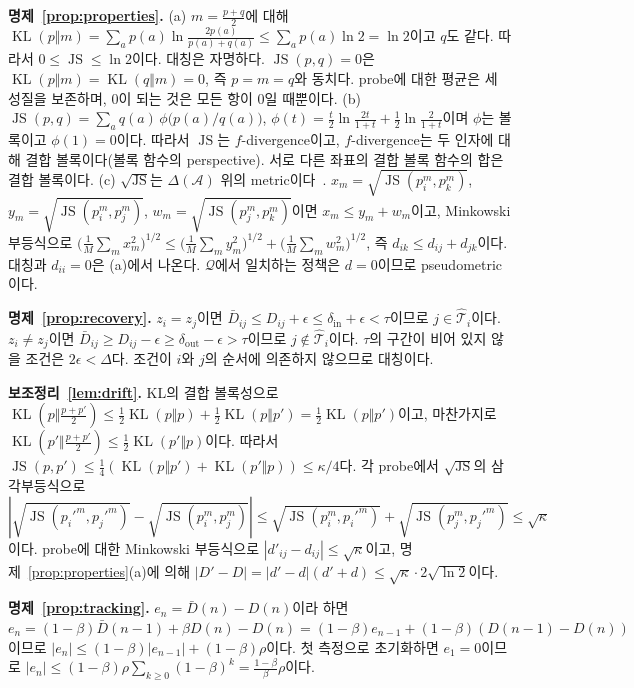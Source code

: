 \documentclass[twocolumn,10pt]{article}
\theoremstyle{remark}
\newcommand{\JS}{\operatorname{JS}}
\newcommand{\KL}{\operatorname{KL}}
\begin{document}
\textbf{명제~\ref{prop:properties}.}
(a) $m=\frac{p+q}{2}$에 대해 $\KL(p\Vert m)=\sum_a p(a)\ln\frac{2p(a)}{p(a)+q(a)}\le\sum_a p(a)\ln 2=\ln 2$이고 $q$도 같다. 따라서 $0\le\JS\le\ln2$이다. 대칭은 자명하다.
$\JS(p,q)=0$은 $\KL(p\Vert m)=\KL(q\Vert m)=0$, 즉 $p=m=q$와 동치다. probe에 대한 평균은 세 성질을 보존하며, 0이 되는 것은 모든 항이 0일 때뿐이다.
(b) $\JS(p,q)=\sum_a q(a)\,\phi\!\big(p(a)/q(a)\big)$, $\phi(t)=\frac{t}{2}\ln\frac{2t}{1+t}+\frac12\ln\frac{2}{1+t}$이며 $\phi$는 볼록이고 $\phi(1)=0$이다. 따라서 $\JS$는
$f$-divergence이고, $f$-divergence는 두 인자에 대해 결합 볼록이다(볼록 함수의 perspective). 서로 다른 좌표의 결합 볼록 함수의 합은 결합 볼록이다.
(c) $\sqrt{\JS}$는 $\Delta(\mathcal{A})$ 위의 metric이다~\cite{endres2003metric}. $x_m=\sqrt{\JS(p_i^m,p_k^m)}$, $y_m=\sqrt{\JS(p_i^m,p_j^m)}$, $w_m=\sqrt{\JS(p_j^m,p_k^m)}$이면
$x_m\le y_m+w_m$이고, Minkowski 부등식으로 $\big(\frac1M\sum_m x_m^2\big)^{1/2}\le\big(\frac1M\sum_m y_m^2\big)^{1/2}+\big(\frac1M\sum_m w_m^2\big)^{1/2}$, 즉 $d_{ik}\le d_{ij}+d_{jk}$이다.
대칭과 $d_{ii}=0$은 (a)에서 나온다. $\mathcal{Q}$에서 일치하는 정책은 $d=0$이므로 pseudometric이다.

\textbf{명제~\ref{prop:recovery}.} $z_i=z_j$이면 $\bar D_{ij}\le D_{ij}+\epsilon\le\delta_{\mathrm{in}}+\epsilon<\tau$이므로 $j\in\hat{\mathcal{T}}_i$이다. $z_i\ne z_j$이면
$\bar D_{ij}\ge D_{ij}-\epsilon\ge\delta_{\mathrm{out}}-\epsilon>\tau$이므로 $j\notin\hat{\mathcal{T}}_i$이다. $\tau$의 구간이 비어 있지 않을 조건은 $2\epsilon<\Delta$다. 조건이 $i$와 $j$의
순서에 의존하지 않으므로 대칭이다.

\textbf{보조정리~\ref{lem:drift}.} KL의 결합 볼록성으로 $\KL(p\Vert\frac{p+p'}{2})\le\frac12\KL(p\Vert p)+\frac12\KL(p\Vert p')=\frac12\KL(p\Vert p')$이고, 마찬가지로
$\KL(p'\Vert\frac{p+p'}{2})\le\frac12\KL(p'\Vert p)$이다. 따라서 $\JS(p,p')\le\frac14(\KL(p\Vert p')+\KL(p'\Vert p))\le\kappa/4$다. 각 probe에서 $\sqrt{\JS}$의 삼각부등식으로
$|\sqrt{\JS(p_i'^m,p_j'^m)}-\sqrt{\JS(p_i^m,p_j^m)}|\le\sqrt{\JS(p_i^m,p_i'^m)}+\sqrt{\JS(p_j^m,p_j'^m)}\le\sqrt{\kappa}$이다. probe에 대한 Minkowski 부등식으로
$|d'_{ij}-d_{ij}|\le\sqrt{\kappa}$이고, 명제~\ref{prop:properties}(a)에 의해 $|D'-D|=|d'-d|(d'+d)\le\sqrt{\kappa}\cdot2\sqrt{\ln 2}$이다.

\textbf{명제~\ref{prop:tracking}.} $e_n=\bar D(n)-D(n)$이라 하면 $e_n=(1-\beta)\bar D(n-1)+\beta D(n)-D(n)=(1-\beta)e_{n-1}+(1-\beta)(D(n-1)-D(n))$이므로
$|e_n|\le(1-\beta)|e_{n-1}|+(1-\beta)\rho$이다. 첫 측정으로 초기화하면 $e_1=0$이므로 $|e_n|\le(1-\beta)\rho\sum_{k\ge0}(1-\beta)^k=\frac{1-\beta}{\beta}\rho$이다.
\end{document}
